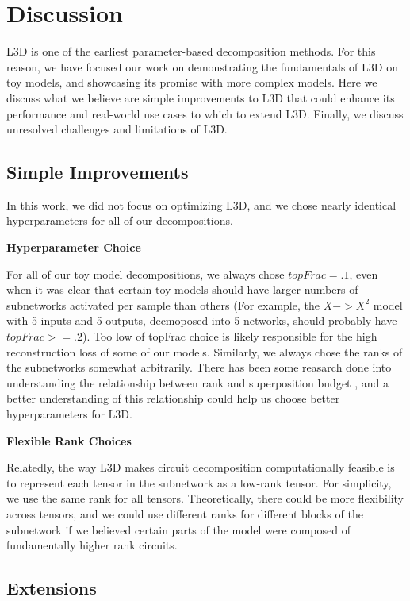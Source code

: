 \documentclass{article}
\theoremstyle{plain}
\theoremstyle{definition}
\theoremstyle{remark}
\begin{document}
\section{Discussion}

L3D is one of the earliest parameter-based decomposition methods. For this reason, we have focused our work on demonstrating the fundamentals of L3D on toy models, and showcasing its promise with more complex models. Here we discuss what we believe are simple improvements to L3D that could enhance its performance and real-world use cases to which to extend L3D. Finally, we discuss unresolved challenges and limitations of L3D. 

\subsection{Simple Improvements}
In this work, we did not focus on optimizing L3D, and we chose nearly identical hyperparameters for all of our decompositions. 

\textbf{Hyperparameter Choice}

For all of our toy model decompositions, we always chose $topFrac=.1$, even when it was clear that certain toy models should have larger numbers of subnetworks activated per sample than others (For example, the $X->X^2$ model with 5 inputs and 5 outputs, decmoposed into 5 networks, should probably have $topFrac>=.2$). Too low of topFrac choice is likely responsible for the high reconstruction loss of some of our models. Similarly, we always chose the ranks of the subnetworks somewhat arbitrarily. There has been some reasarch done into understanding the relationship between rank and superposition budget \cite{}, and a better understanding of this relationship could help us choose better hyperparameters for L3D. 

\textbf{Flexible Rank Choices}

Relatedly, the way L3D makes circuit decomposition computationally feasible is to represent each tensor in the subnetwork as a low-rank tensor. For simplicity, we use the same rank for all tensors. Theoretically, there could be more flexibility across tensors, and we could use different ranks for different blocks of the subnetwork if we believed certain parts of the model were composed of fundamentally higher rank circuits. 

\subsection{Extensions}
\end{document}

